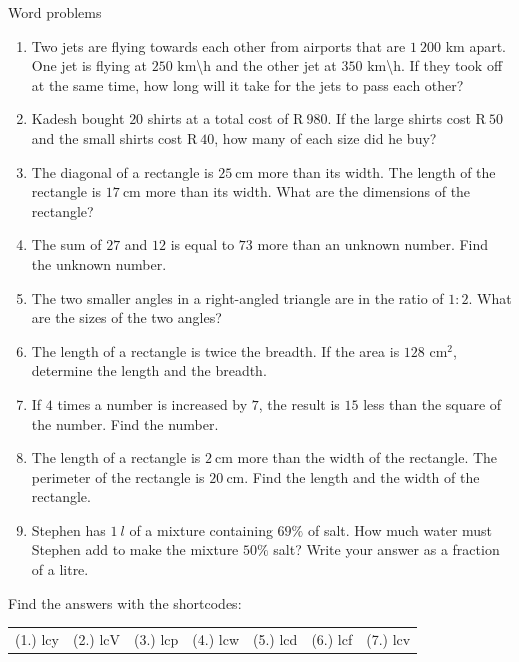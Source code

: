 \begin{exercises}{Word problems}
{
\begin{enumerate}[noitemsep, label=\textbf{\arabic*}. ] 
\item Two jets are flying towards each other from airports that are $1~200$ km apart. One jet is flying at $250$ km\textbackslash h and the other jet at $350$ km\textbackslash h. If they took off at the same time, how long will it take for the jets to pass each other?
\item Kadesh bought $20$ shirts at a total cost of R$~980$. If the large shirts cost R$~50$ and the small shirts cost R$~40$, how many of each size did he buy?
\item The diagonal of a rectangle is $25~$cm more than its width. The length of the rectangle is $17~$cm more than its width. What are the dimensions of the rectangle?  
\item The sum of $27$ and $12$ is equal to $73$ more than an unknown number. Find the unknown number.
\item The two smaller angles in a right-angled triangle are in the ratio of $1:2$. What are the sizes of the two angles? 
\item The length of a rectangle is twice the breadth. If the area is $128$ cm$^{2}$, determine the length and the breadth.       
\item If $4$ times a number is increased by $7$, the result is $15$ less than the square of the number. Find the number.
\item The length of a rectangle is $2~$cm more than the width of the rectangle. The perimeter of the rectangle is $20~$cm. Find the length and the width of the rectangle.
\item Stephen has $1~l$ of a mixture containing $69\%$ of salt. How much water must Stephen add to make the mixture $50\%$ salt? Write your answer as a fraction of a litre.
       
\end{enumerate}

\par {} Find the answers with the shortcodes:
\par \begin{tabular}[h]{cccccc}
(1.) lcy  &  (2.) lcV  &  (3.) lcp  &  (4.) lcw  &  (5.) lcd  &  (6.) lcf  &  (7.) lcv  & \end{tabular}
}
\end{exercises}

